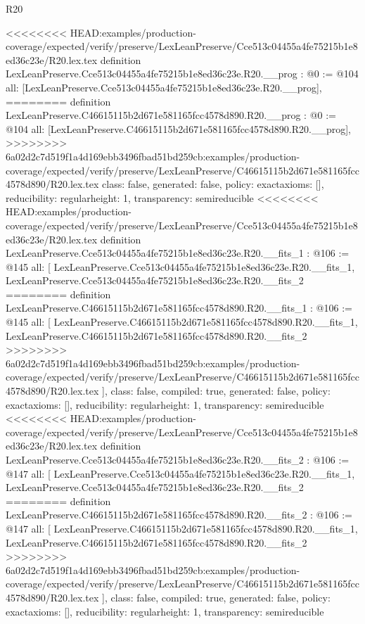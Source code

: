 \begin{lexlean}{R20}
\begin{coremodule}
<<<<<<<< HEAD:examples/production-coverage/expected/verify/preserve/LexLeanPreserve/Cce513c04455a4fe75215b1e8ed36c23e/R20.lex.tex
definition LexLeanPreserve.Cce513c04455a4fe75215b1e8ed36c23e.R20.__prog : @0 := @104 {
  all: [LexLeanPreserve.Cce513c04455a4fe75215b1e8ed36c23e.R20.__prog],
========
definition LexLeanPreserve.C46615115b2d671e581165fcc4578d890.R20.__prog : @0 := @104 {
  all: [LexLeanPreserve.C46615115b2d671e581165fcc4578d890.R20.__prog],
>>>>>>>> 6a02d2c7d519f1a4d169ebb3496fbad51bd259cb:examples/production-coverage/expected/verify/preserve/LexLeanPreserve/C46615115b2d671e581165fcc4578d890/R20.lex.tex
  class: false,
  generated: false,
  policy: exact{axioms: []},
  reducibility: regular{height: 1},
  transparency: semireducible
}
<<<<<<<< HEAD:examples/production-coverage/expected/verify/preserve/LexLeanPreserve/Cce513c04455a4fe75215b1e8ed36c23e/R20.lex.tex
definition LexLeanPreserve.Cce513c04455a4fe75215b1e8ed36c23e.R20.__fits_1 : @106 := @145 {
  all: [
    LexLeanPreserve.Cce513c04455a4fe75215b1e8ed36c23e.R20.__fits_1,
    LexLeanPreserve.Cce513c04455a4fe75215b1e8ed36c23e.R20.__fits_2
========
definition LexLeanPreserve.C46615115b2d671e581165fcc4578d890.R20.__fits_1 : @106 := @145 {
  all: [
    LexLeanPreserve.C46615115b2d671e581165fcc4578d890.R20.__fits_1,
    LexLeanPreserve.C46615115b2d671e581165fcc4578d890.R20.__fits_2
>>>>>>>> 6a02d2c7d519f1a4d169ebb3496fbad51bd259cb:examples/production-coverage/expected/verify/preserve/LexLeanPreserve/C46615115b2d671e581165fcc4578d890/R20.lex.tex
  ],
  class: false,
  compiled: true,
  generated: false,
  policy: exact{axioms: []},
  reducibility: regular{height: 1},
  transparency: semireducible
}
<<<<<<<< HEAD:examples/production-coverage/expected/verify/preserve/LexLeanPreserve/Cce513c04455a4fe75215b1e8ed36c23e/R20.lex.tex
definition LexLeanPreserve.Cce513c04455a4fe75215b1e8ed36c23e.R20.__fits_2 : @106 := @147 {
  all: [
    LexLeanPreserve.Cce513c04455a4fe75215b1e8ed36c23e.R20.__fits_1,
    LexLeanPreserve.Cce513c04455a4fe75215b1e8ed36c23e.R20.__fits_2
========
definition LexLeanPreserve.C46615115b2d671e581165fcc4578d890.R20.__fits_2 : @106 := @147 {
  all: [
    LexLeanPreserve.C46615115b2d671e581165fcc4578d890.R20.__fits_1,
    LexLeanPreserve.C46615115b2d671e581165fcc4578d890.R20.__fits_2
>>>>>>>> 6a02d2c7d519f1a4d169ebb3496fbad51bd259cb:examples/production-coverage/expected/verify/preserve/LexLeanPreserve/C46615115b2d671e581165fcc4578d890/R20.lex.tex
  ],
  class: false,
  compiled: true,
  generated: false,
  policy: exact{axioms: []},
  reducibility: regular{height: 1},
  transparency: semireducible
}}}}
\end{coremodule}
\end{lexlean}
